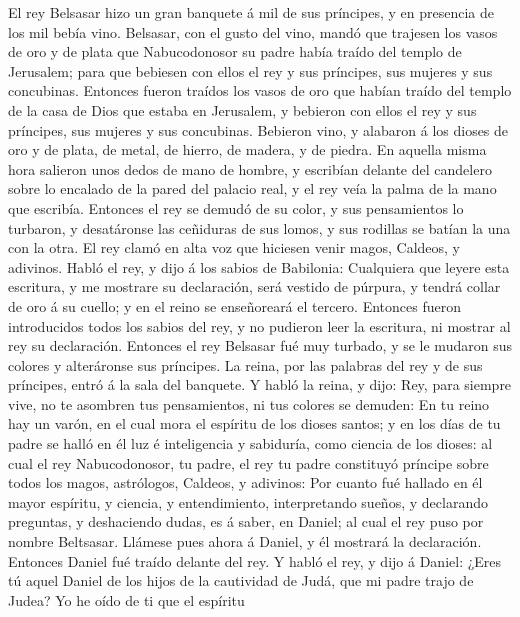  El rey Belsasar hizo un gran banquete á mil de sus
príncipes, y en presencia de los mil bebía vino. 
Belsasar, con el gusto del vino, mandó que trajesen los vasos de oro y
de plata que Nabucodonosor su padre había traído del templo de
Jerusalem; para que bebiesen con ellos el rey y sus príncipes, sus
mujeres y sus concubinas.  Entonces fueron traídos los
vasos de oro que habían traído del templo de la casa de Dios que estaba
en Jerusalem, y bebieron con ellos el rey y sus príncipes, sus mujeres y
sus concubinas.  Bebieron vino, y alabaron á los dioses de
oro y de plata, de metal, de hierro, de madera, y de piedra.
 En aquella misma hora salieron unos dedos de mano de
hombre, y escribían delante del candelero sobre lo encalado de la pared
del palacio real, y el rey veía la palma de la mano que escribía.
 Entonces el rey se demudó de su color, y sus pensamientos
lo turbaron, y desatáronse las ceñiduras de sus lomos, y sus rodillas se
batían la una con la otra.  El rey clamó en alta voz que
hiciesen venir magos, Caldeos, y adivinos. Habló el rey, y dijo á los
sabios de Babilonia: Cualquiera que leyere esta escritura, y me mostrare
su declaración, será vestido de púrpura, y tendrá collar de oro á su
cuello; y en el reino se enseñoreará el tercero.  Entonces
fueron introducidos todos los sabios del rey, y no pudieron leer la
escritura, ni mostrar al rey su declaración.  Entonces el
rey Belsasar fué muy turbado, y se le mudaron sus colores y alteráronse
sus príncipes.  La reina, por las palabras del rey y de
sus príncipes, entró á la sala del banquete. Y habló la reina, y dijo:
Rey, para siempre vive, no te asombren tus pensamientos, ni tus colores
se demuden:  En tu reino hay un varón, en el cual mora el
espíritu de los dioses santos; y en los días de tu padre se halló en él
luz é inteligencia y sabiduría, como ciencia de los dioses: al cual el
rey Nabucodonosor, tu padre, el rey tu padre constituyó príncipe sobre
todos los magos, astrólogos, Caldeos, y adivinos:  Por
cuanto fué hallado en él mayor espíritu, y ciencia, y entendimiento,
interpretando sueños, y declarando preguntas, y deshaciendo dudas, es á
saber, en Daniel; al cual el rey puso por nombre Beltsasar. Llámese pues
ahora á Daniel, y él mostrará la declaración.  Entonces
Daniel fué traído delante del rey. Y habló el rey, y dijo á Daniel:
¿Eres tú aquel Daniel de los hijos de la cautividad de Judá, que mi
padre trajo de Judea?  Yo he oído de ti que el espíritu
